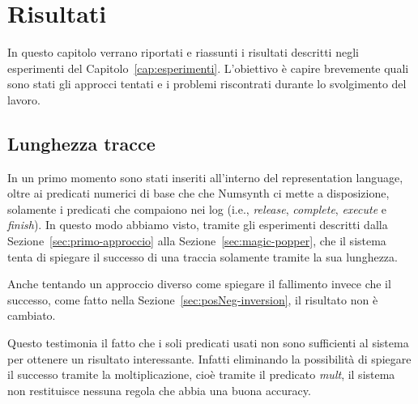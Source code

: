 \chapter{Risultati}
In questo capitolo verrano riportati e riassunti i risultati descritti negli esperimenti del Capitolo~\ref{cap:esperimenti}. L'obiettivo è capire brevemente quali sono stati gli approcci tentati e i problemi riscontrati durante lo svolgimento del lavoro.

\section{Lunghezza tracce}
In un primo momento sono stati inseriti all'interno del representation language, oltre ai predicati numerici di base che che Numsynth ci mette a disposizione, solamente i predicati che compaiono nei log (i.e., \textit{release}, \textit{complete}, \textit{execute} e \textit{finish}). In questo modo abbiamo visto, tramite gli esperimenti descritti dalla Sezione~\ref{sec:primo-approccio} alla Sezione~\ref{sec:magic-popper}, che il sistema tenta di spiegare il successo di una traccia solamente tramite la sua lunghezza.

Anche tentando un approccio diverso come spiegare il fallimento invece che il successo, come fatto nella Sezione~\ref{sec:posNeg-inversion}, il risultato non è cambiato.

Questo testimonia il fatto che i soli predicati usati non sono sufficienti al sistema per ottenere un risultato interessante. Infatti eliminando la possibilità di spiegare il successo tramite la moltiplicazione, cioè tramite il predicato \textit{mult}, il sistema non restituisce nessuna regola che abbia una buona accuracy.